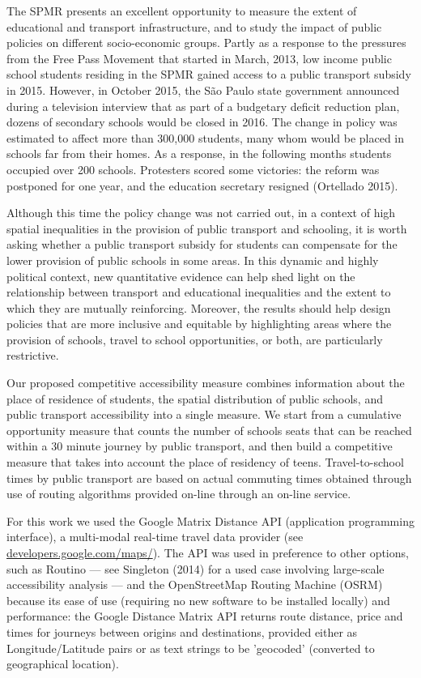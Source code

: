\documentclass[3p,authoryear,preprint,review,12pt]{elsarticle}
\begin{document}
The SPMR presents an excellent opportunity to measure the extent of
educational and transport infrastructure, and to study the impact of
public policies on different socio-economic groups. Partly as a response to the pressures from the Free Pass Movement that started in March, 2013, low income public school students residing in the SPMR gained access to a public transport subsidy in 2015. However, in October 2015, the São Paulo state government announced during a television interview that as part of a budgetary deficit reduction plan, dozens of secondary schools would be closed in 2016. The change in policy was estimated to affect more than 300,000 students, many whom would be placed in schools far from their homes. As a response, in the following months students occupied over 200 schools. Protesters scored some victories: the reform was postponed for one year, and the education secretary resigned (Ortellado 2015).

Although this time the policy change was not carried out, in a context of high spatial inequalities in the provision of public transport and schooling, it is worth asking whether a public transport subsidy for students can compensate for the lower provision of public schools in some areas. In this dynamic and highly political context, new quantitative evidence can help shed light on the relationship between transport and educational inequalities and the extent to which they are mutually reinforcing. Moreover, the results should help design policies that are more inclusive and equitable by highlighting areas where the
provision of schools, travel to school opportunities, or both, are
particularly restrictive.

Our proposed competitive accessibility measure combines information
about the place of residence of students, the spatial distribution of public schools, and public transport accessibility into a single
measure. We start from a cumulative opportunity measure that counts the number of schools seats that can be reached within a 30 minute journey by public transport, and then build a competitive measure that takes into account the place of residency of teens. Travel-to-school times by public transport are based on actual commuting times obtained through use of routing algorithms provided on-line through an on-line service. 

For this work we used the Google Matrix Distance API
(application programming interface), a multi-modal
real-time travel data provider (see \href{https://developers.google.com/maps/documentation/distance-matrix/}{developers.google.com/maps/}). 
The API was used in preference to other options,
such as Routino --- see Singleton (2014) for a used case involving large-scale accessibility analysis ---
and the OpenStreetMap Routing Machine (OSRM)
because its
ease of use (requiring no new software to be installed locally)
and performance: the Google Distance Matrix
API returns
route distance, price and times for journeys between origins and
destinations, provided either as Longitude/Latitude pairs or
as text strings to be 'geocoded' (converted to geographical location).
\end{document}
